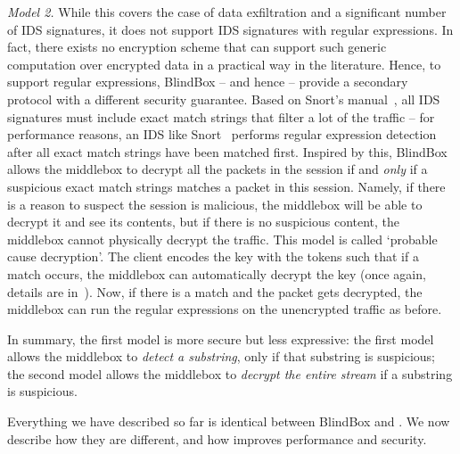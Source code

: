  {\em Model 2.}  While this covers the case of data exfiltration and a significant number of IDS signatures, it does not support  IDS signatures with regular expressions.
 In fact, there exists no encryption scheme that can support such generic computation over encrypted data in a practical way in the literature. 
  Hence, to support regular expressions, BlindBox -- and hence \sys -- provide a secondary protocol with a different security guarantee. 
  Based on Snort's manual~\cite{Snort_manual}, all  IDS signatures must include exact match strings that filter a lot of the traffic -- for performance reasons, an IDS like Snort~\cite{Snort} performs regular expression detection after all exact match strings have been matched first.
  Inspired by this, BlindBox allows the middlebox to decrypt all the packets in the session if and {\it only} if a suspicious exact match strings matches a packet in this session.
  Namely, if there is a reason to suspect the session is malicious, the middlebox will be able to decrypt it and see its contents, but if there is no suspicious content, the middlebox cannot physically decrypt the traffic.  This model is called `probable cause decryption'.
  The client encodes the key with the tokens such that if a match occurs, the middlebox can automatically decrypt the key (once again, details are in~\cite{blindbox}).
  Now, if there is a match and the packet gets decrypted, the middlebox can run the regular expressions on the unencrypted traffic as before. 
  
  
  In summary, the first model is more secure but less expressive: 
  the first model allows the middlebox to {\it detect a substring}, only if that substring is suspicious;
  the second model allows the middlebox to {\it decrypt the entire stream} if a substring is suspicious.
  
  Everything we have described so far is identical between BlindBox and \sys. We now describe how they are different, and how \sys improves performance and security.

